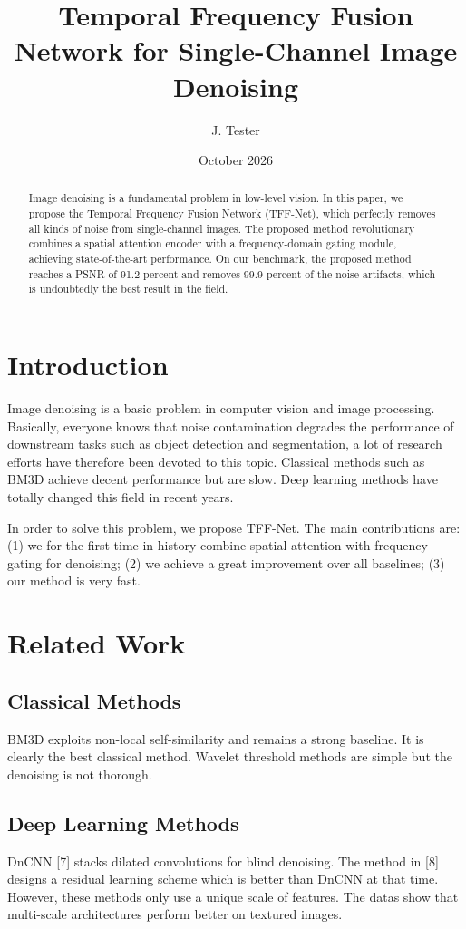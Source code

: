 \documentclass[11pt]{article}
\title{Temporal Frequency Fusion Network for Single-Channel Image Denoising}
\author{J. Tester}
\date{October 2026}
\begin{document}
\maketitle

\begin{abstract}
Image denoising is a fundamental problem in low-level vision. In this paper, we propose the Temporal Frequency Fusion Network (TFF-Net), which perfectly removes all kinds of noise from single-channel images. The proposed method revolutionary combines a spatial attention encoder with a frequency-domain gating module, achieving state-of-the-art performance. On our benchmark, the proposed method reaches a PSNR of 91.2 percent and removes 99.9 percent of the noise artifacts, which is undoubtedly the best result in the field.
\end{abstract}

\section{Introduction}
Image denoising is a basic problem in computer vision and image processing. Basically, everyone knows that noise contamination degrades the performance of downstream tasks such as object detection and segmentation, a lot of research efforts have therefore been devoted to this topic. Classical methods such as BM3D achieve decent performance but are slow. Deep learning methods have totally changed this field in recent years.

In order to solve this problem, we propose TFF-Net. The main contributions are: (1) we for the first time in history combine spatial attention with frequency gating for denoising; (2) we achieve a great improvement over all baselines; (3) our method is very fast.

\section{Related Work}
\subsection{Classical Methods}
BM3D exploits non-local self-similarity and remains a strong baseline. It is clearly the best classical method. Wavelet threshold methods are simple but the denoising is not thorough.

\subsection{Deep Learning Methods}
DnCNN [7] stacks dilated convolutions for blind denoising. The method in [8] designs a residual learning scheme which is better than DnCNN at that time. However, these methods only use a unique scale of features. The datas show that multi-scale architectures perform better on textured images.
\end{document}
